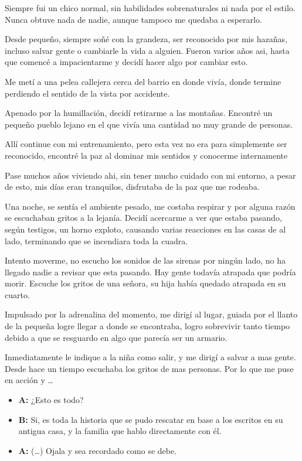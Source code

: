 \documentclass[letterpaper, 12pt]{report}
\begin{document}
Siempre fui un chico normal, sin habilidades sobrenaturales
ni nada por el estilo. Nunca obtuve nada de nadie, aunque
tampoco me quedaba a esperarlo.

Desde pequeño, siempre soñé con la grandeza, ser reconocido
por mis hazañas, incluso salvar gente o cambiarle la vida a
alguien. Fueron varios años asi, hasta que comencé a
impacientarme y decidí hacer algo por cambiar esto.

Me metí a una pelea callejera cerca del barrio en donde
vivía, donde termine perdiendo el sentido de la vista por
accidente.

Apenado por la humillación, decidí retirarme a las
montañas. Encontré un pequeño pueblo lejano en el que vivía
una cantidad no muy grande de personas.

Allí continue con mi entrenamiento, pero esta vez no era
para simplemente ser reconocido, encontré la paz al dominar
mis sentidos y conocerme internamente

Pase muchos años viviendo ahi, sin tener mucho cuidado con
mi entorno, a pesar de esto, mis días eran tranquilos,
disfrutaba de la paz que me rodeaba.

Una noche, se sentía el ambiente pesado, me costaba
respirar y por alguna razón se escuchaban gritos a la
lejanía. Decidí acercarme a ver que estaba pasando, según
testigos, un horno exploto, causando varias reacciones en
las casas de al lado, terminando que se incendiara toda la
cuadra.

Intento moverme, no escucho los sonidos de las sirenas por
ningún lado, no ha llegado nadie a revisar que esta
pasando. Hay gente todavía atrapada que podría morir.
Escuche los gritos de una señora, su hija había quedado
atrapada en su cuarto.

Impulsado por la adrenalina del momento, me dirigí al
lugar, guiada por el llanto de la pequeña logre llegar a
donde se encontraba, logro sobrevivir tanto tiempo debido a
que se resguardo en algo que parecía ser un armario.

Inmediatamente le indique a la niña como salir, y me dirigí
a salvar a mas gente. Desde hace un tiempo escuchaba los
gritos de mas personas. Por lo que me puse en acción y \dots

\begin{itemize}
      \item \textbf{A:} ¿Esto es todo?
      \item \textbf{B:} Si, es toda la historia que se pudo rescatar en base a los
            escritos en su antigua casa, y la familia que hablo directamente
            con él.
      \item \textbf{A:} (\dots) Ojala y sea recordado como se debe.
\end{itemize}
\end{document}
